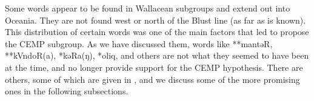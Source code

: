 Some words appear to be found in Wallacean subgroups
and extend out into Oceania.
They are not found west or north of the Blust line (as far as is known).
This distribution of certain words was one of the main factors
that led \citet{Blust1982,Blust1993,Blust2009,Blust2012b} to propose the CEMP subgroup.
As we have discussed them,
words like **mantəR, **kVndoR(a),
*kəRa(ŋ), *oliq, and others are not what they seemed to have
been at the time,
and no longer provide support for the CEMP hypothesis.
There are others, some of which are given in ,
and we discuss some of the more promising ones in the following
subsections.